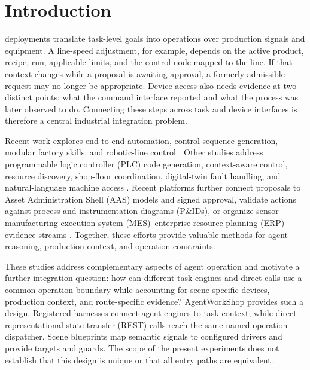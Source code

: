 \section{Introduction}
 deployments translate task-level goals into
operations over production signals and equipment. A line-speed adjustment,
for example, depends on the active product, recipe, run, applicable limits,
and the control node mapped to the line. If that context changes while a
proposal is awaiting approval, a formerly admissible request may no longer be
appropriate. Device access also needs evidence at two distinct points: what
the command interface reported and what the process was later observed to do.
Connecting these steps across task and device interfaces is therefore a
central industrial integration problem.

Recent work explores end-to-end automation, control-sequence generation,
modular factory skills, and robotic-line control
\cite{xia2025control,huang2026made,koehle2026llmdriven,waseem2026pretrained}.
Other studies address programmable logic controller (PLC) code generation,
context-aware control, resource discovery, shop-floor coordination,
digital-twin fault handling, and natural-language machine access
\cite{liu2026agents4plc,wu2025instructmpc,lim2025llmenabled,zhao2026shopfloor,gill2025llmdt,hofmann2025nlc}.
Recent platforms further connect proposals to Asset Administration Shell
(AAS) models and signed approval, validate actions against process and
instrumentation diagrams (P\&IDs), or organize sensor--manufacturing
execution system (MES)--enterprise resource planning (ERP) evidence streams
\cite{graul2026aas,schall2026safe,lin2026agentic}. Together, these efforts
provide valuable methods for agent reasoning, production context, and
operation constraints.

These studies address complementary aspects of agent operation and motivate a
further integration question: how can different task engines and direct calls
use a common operation boundary while accounting for scene-specific devices,
production context, and route-specific evidence? AgentWorkShop provides such
a design. Registered harnesses connect agent engines to task context, while
direct representational state transfer (REST) calls reach the same
named-operation dispatcher. Scene blueprints map semantic signals to configured
drivers and provide targets and guards. The scope of the present experiments
does not establish that this design is unique or that all entry paths are
equivalent.

